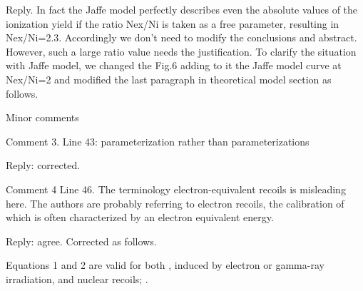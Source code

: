 \documentclass[page-classic]{epl2}
\begin{document}
\vspace{0.5 cm}

Reply. In fact the Jaffe model perfectly describes even the absolute
values of the ionization yield if the ratio Nex/Ni is taken as a
free parameter, resulting in Nex/Ni=2.3. Accordingly we don't need
to modify the conclusions and abstract. However, such a large ratio
value needs the justification. To clarify the situation with
Jaffe model, we changed the Fig.6 adding to it the Jaffe model curve
at Nex/Ni=2 and modified the last paragraph in theoretical model
section as follows.

\vspace{0.5 cm}


\vspace{0.5 cm}

Minor comments

\vspace{0.5 cm}

Comment 3. Line 43: parameterization rather than parameterizations

\vspace{0.5 cm}

Reply: corrected.

\vspace{0.5 cm}

Comment 4 Line 46. The terminology electron-equivalent recoils is
misleading here.  The authors are probably referring to electron
recoils, the calibration of which is often characterized by an
electron equivalent energy.

\vspace{0.5 cm}

Reply: agree. Corrected as follows.

\vspace{0.5 cm}

Equations 1 and 2 are valid for both ,
induced by electron or gamma-ray irradiation, and nuclear recoils;
.
\end{document}
